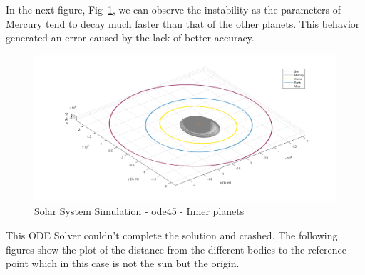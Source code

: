 \documentclass[a4paper]{article}
\begin{document}
In the next figure, Fig~\ref{fig:Solar_System_-_ode45_-_ipsim}, we can observe the instability as the parameters of Mercury tend to decay much faster than that of the other planets. This behavior generated an error caused by the lack of better accuracy.

\begin{figure}[H]
\centering
\includegraphics[width=1\textwidth]{Solar_System_-_ode45_-_ipsim.png}
\caption{Solar System Simulation - ode45 - Inner planets }
\label{fig:Solar_System_-_ode45_-_ipsim}
\end{figure}

This ODE Solver couldn't complete the solution and crashed. The following figures show the plot of the distance from the different bodies to the reference point which in this case is not the sun but the origin. 
\end{document}

